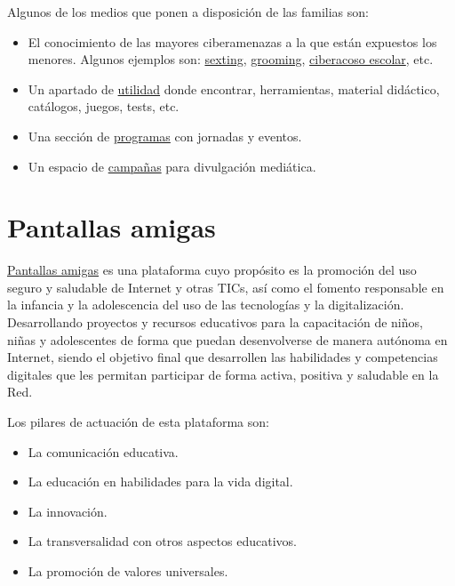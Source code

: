 \documentclass[
  spanish,
  a4paper,
  openany]{book}
\begin{document}
Algunos de los medios que ponen a disposición de las familias son:

\begin{itemize}
\item
  El conocimiento de las mayores ciberamenazas a la que están expuestos los menores. Algunos ejemplos son: \href{https://www.is4k.es/necesitas-saber/sexting}{sexting}, \href{https://www.is4k.es/necesitas-saber/grooming}{grooming}, \href{https://www.is4k.es/necesitas-saber/ciberacoso-escolar}{ciberacoso escolar}, etc.
\item
  Un apartado de \href{https://www.is4k.es/de-utilidad}{utilidad} donde encontrar, herramientas, material didáctico, catálogos, juegos, tests, etc.
\item
  Una sección de \href{https://www.is4k.es/programas}{programas} con jornadas y eventos.
\item
  Un espacio de \href{https://www.is4k.es/campanas}{campañas} para divulgación mediática.
\end{itemize}

\hypertarget{pantallas-amigas}{%
\section{Pantallas amigas}\label{pantallas-amigas}}

\href{https://www.pantallasamigas.net/}{Pantallas amigas} es una plataforma cuyo propósito es la promoción del uso seguro y saludable de Internet y otras TICs, así como el fomento responsable en la infancia y la adolescencia del uso de las tecnologías y la digitalización. Desarrollando proyectos y recursos educativos para la capacitación de niños, niñas y adolescentes de forma que puedan desenvolverse de manera autónoma en Internet, siendo el objetivo final que desarrollen las habilidades y competencias digitales que les permitan participar de forma activa, positiva y saludable en la Red.

Los pilares de actuación de esta plataforma son:

\begin{itemize}
\item
  La comunicación educativa.
\item
  La educación en habilidades para la vida digital.
\item
  La innovación.
\item
  La transversalidad con otros aspectos educativos.
\item
  La promoción de valores universales.
\end{itemize}
\end{document}
